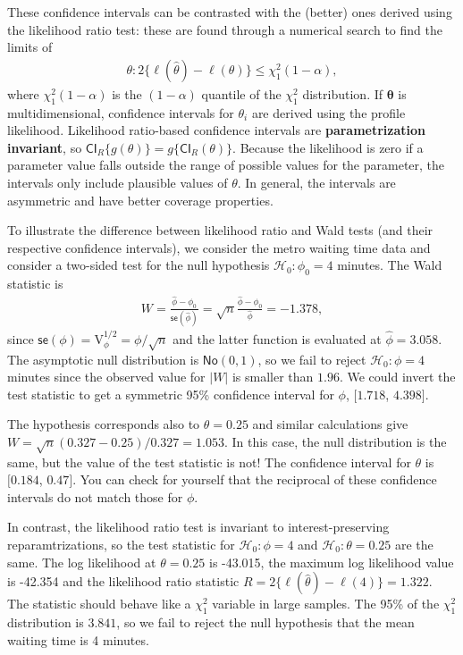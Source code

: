 \documentclass[
  11pt,
  letterpaper,
]{book}
\theoremstyle{definition}
\theoremstyle{definition}
\theoremstyle{definition}
\theoremstyle{remark}
\begin{document}
These confidence intervals can be contrasted with the (better) ones derived using the likelihood ratio test: these are found through a numerical search to find the limits of
\begin{align*}
\theta: 2\{\ell(\widehat{\theta}) - \ell(\theta)\} \leq \chi^2_1(1-\alpha),
\end{align*}
where \(\chi^2_1(1-\alpha)\) is the \((1-\alpha)\) quantile of the \(\chi^2_1\) distribution. If \(\boldsymbol{\theta}\) is multidimensional, confidence intervals for \(\theta_i\) are derived using the profile likelihood. Likelihood ratio-based confidence intervals are \textbf{parametrization invariant}, so \(\mathsf{CI}_{R}\{g(\theta)\} = g\{\mathsf{CI}_{R}(\theta)\}\). Because the likelihood is zero if a parameter value falls outside the range of possible values for the parameter, the intervals only include plausible values of \(\theta\). In general, the intervals are asymmetric and have better coverage properties.

To illustrate the difference between likelihood ratio and Wald tests (and their respective confidence intervals), we consider the metro waiting time data and consider a two-sided test for the null hypothesis \(\mathscr{H}_0: \phi_0=4\) minutes. The Wald statistic is
\begin{align*}
W =\frac{\hat{\phi}-\phi_0}{\mathsf{se}(\widehat{\phi})}=\sqrt{n}\frac{\widehat{\phi}-\phi_0}{\widehat{\phi}}= -1.378,
\end{align*}
since \(\mathsf{se}(\phi)=\mathrm{V}^{1/2}_{\phi}=\phi/\sqrt{n}\) and the latter function is evaluated at \(\widehat{\phi}=3.058\). The asymptotic null distribution is \(\mathsf{No}(0,1)\), so we fail to reject \(\mathscr{H}_0: \phi=4\) minutes since the observed value for \(|W|\) is smaller than \(1.96\). We could invert the test statistic to get a symmetric 95\% confidence interval for \(\phi\), \([1.718\), \(4.398]\).

The hypothesis corresponds also to \(\theta=0.25\) and similar calculations give \(W = \sqrt{n}(0.327 - 0.25)/0.327 = 1.053\). In this case, the null distribution is the same, but the value of the test statistic is not! The confidence interval for \(\theta\) is \([0.184\), \(0.47]\). You can check for yourself that the reciprocal of these confidence intervals do not match those for \(\phi\).

In contrast, the likelihood ratio test is invariant to interest-preserving reparamtrizations, so the test statistic for \(\mathscr{H}_0: \phi=4\) and \(\mathscr{H}_0: \theta = 0.25\) are the same. The log likelihood at \(\theta=0.25\) is -43.015, the maximum log likelihood value is -42.354
and the likelihood ratio statistic \(R=2 \{\ell(\widehat{\theta}) - \ell(4)\}= 1.322\). The statistic should behave like a \(\chi^2_1\) variable in large samples. The 95\% of the \(\chi^2_1\) distribution is \(3.841\), so we fail to reject the null hypothesis that the mean waiting time is 4 minutes.
\end{document}
